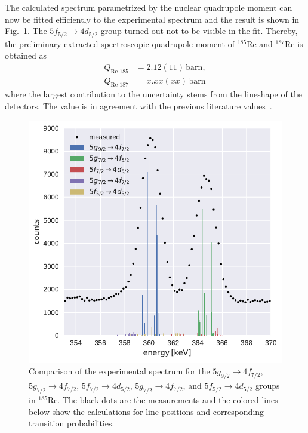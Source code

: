 The calculated spectrum parametrized by the nuclear quadrupole moment can now be fitted efficiently to the experimental spectrum and the result is shown in Fig.~\ref{fig:re54}. The $5f_{5/2}\rightarrow 4d_{5/2}$ group turned out not to be visible in the fit. Thereby, the preliminary extracted spectroscopic quadrupole moment of $^{185}$Re and $^{187}$Re is obtained as
\begin{align}
Q_{\text{Re-}185} &= 2.12(11)\,\text{barn},\\
Q_{\text{Re-}187} &= x.xx(xx)\,\text{barn}
\end{align}
where the largest contribution to the uncertainty stems from the lineshape of the detectors. The value is in agreement with the previous literature values~\cite{Stone2005}.

\begin{figure}%
\raggedright
\includegraphics[width=1.02\textwidth]{pics/comparison}
\caption{
Comparison of the experimental spectrum for the $5g_{9/2}\rightarrow4f_{7/2}$, $5g_{7/2}\rightarrow4f_{7/2}$, $5f_{7/2}\rightarrow4d_{5/2}$, $5g_{7/2}\rightarrow4f_{7/2}$, and $5f_{5/2}\rightarrow4d_{5/2}$ groups in $^{185}$Re. The black dots are the measurements and the colored lines below show the calculations for line positions and corresponding transition probabilities.
}
\label{fig:re54}
\end{figure}
%
